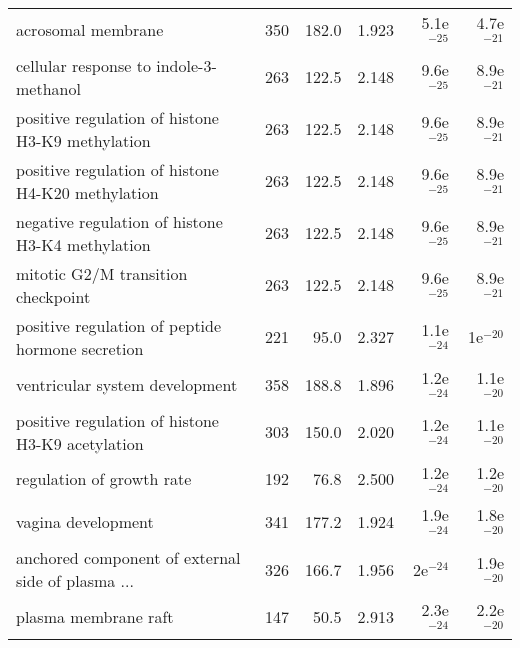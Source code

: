 \begin{longtable}{lrrrrr}
                                acrosomal membrane &                     350 &                   182.0 &      1.923 &         5.1e$^{-25}$ &         4.7e$^{-21}$ \\
            cellular response to indole-3-methanol &                     263 &                   122.5 &      2.148 &         9.6e$^{-25}$ &         8.9e$^{-21}$ \\
  positive regulation of histone H3-K9 methylation &                     263 &                   122.5 &      2.148 &         9.6e$^{-25}$ &         8.9e$^{-21}$ \\
 positive regulation of histone H4-K20 methylation &                     263 &                   122.5 &      2.148 &         9.6e$^{-25}$ &         8.9e$^{-21}$ \\
  negative regulation of histone H3-K4 methylation &                     263 &                   122.5 &      2.148 &         9.6e$^{-25}$ &         8.9e$^{-21}$ \\
                mitotic G2/M transition checkpoint &                     263 &                   122.5 &      2.148 &         9.6e$^{-25}$ &         8.9e$^{-21}$ \\
  positive regulation of peptide hormone secretion &                     221 &                    95.0 &      2.327 &         1.1e$^{-24}$ &           1e$^{-20}$ \\
                    ventricular system development &                     358 &                   188.8 &      1.896 &         1.2e$^{-24}$ &         1.1e$^{-20}$ \\
  positive regulation of histone H3-K9 acetylation &                     303 &                   150.0 &      2.020 &         1.2e$^{-24}$ &         1.1e$^{-20}$ \\
                         regulation of growth rate &                     192 &                    76.8 &      2.500 &         1.2e$^{-24}$ &         1.2e$^{-20}$ \\
                                vagina development &                     341 &                   177.2 &      1.924 &         1.9e$^{-24}$ &         1.8e$^{-20}$ \\
 anchored component of external side of plasma ... &                     326 &                   166.7 &      1.956 &           2e$^{-24}$ &         1.9e$^{-20}$ \\
                              plasma membrane raft &                     147 &                    50.5 &      2.913 &         2.3e$^{-24}$ &         2.2e$^{-20}$ \\

\end{longtable}
